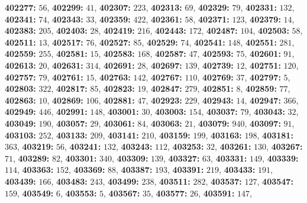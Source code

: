 \textsf{\bfseries 402277:} $56$, \textsf{\bfseries 402299:} $41$, \textsf{\bfseries 402307:} $223$, \textsf{\bfseries 402313:} $69$, \textsf{\bfseries 402329:} $79$, \textsf{\bfseries 402331:} $132$, \textsf{\bfseries 402341:} $74$, \textsf{\bfseries 402343:} $33$, \textsf{\bfseries 402359:} $422$, \textsf{\bfseries 402361:} $58$, \textsf{\bfseries 402371:} $123$, \textsf{\bfseries 402379:} $14$, \textsf{\bfseries 402383:} $205$, \textsf{\bfseries 402403:} $28$, \textsf{\bfseries 402419:} $216$, \textsf{\bfseries 402443:} $172$, \textsf{\bfseries 402487:} $104$, \textsf{\bfseries 402503:} $58$, \textsf{\bfseries 402511:} $13$, \textsf{\bfseries 402517:} $76$, \textsf{\bfseries 402527:} $85$, \textsf{\bfseries 402529:} $74$, \textsf{\bfseries 402541:} $148$, \textsf{\bfseries 402551:} $281$, \textsf{\bfseries 402559:} $255$, \textsf{\bfseries 402581:} $15$, \textsf{\bfseries 402583:} $168$, \textsf{\bfseries 402587:} $47$, \textsf{\bfseries 402593:} $75$, \textsf{\bfseries 402601:} $91$, \textsf{\bfseries 402613:} $20$, \textsf{\bfseries 402631:} $314$, \textsf{\bfseries 402691:} $28$, \textsf{\bfseries 402697:} $139$, \textsf{\bfseries 402739:} $12$, \textsf{\bfseries 402751:} $120$, \textsf{\bfseries 402757:} $79$, \textsf{\bfseries 402761:} $15$, \textsf{\bfseries 402763:} $142$, \textsf{\bfseries 402767:} $110$, \textsf{\bfseries 402769:} $37$, \textsf{\bfseries 402797:} $5$, \textsf{\bfseries 402803:} $322$, \textsf{\bfseries 402817:} $85$, \textsf{\bfseries 402823:} $19$, \textsf{\bfseries 402847:} $279$, \textsf{\bfseries 402851:} $8$, \textsf{\bfseries 402859:} $77$, \textsf{\bfseries 402863:} $10$, \textsf{\bfseries 402869:} $106$, \textsf{\bfseries 402881:} $47$, \textsf{\bfseries 402923:} $229$, \textsf{\bfseries 402943:} $14$, \textsf{\bfseries 402947:} $366$, \textsf{\bfseries 402949:} $446$, \textsf{\bfseries 402991:} $148$, \textsf{\bfseries 403001:} $30$, \textsf{\bfseries 403003:} $154$, \textsf{\bfseries 403037:} $79$, \textsf{\bfseries 403043:} $32$, \textsf{\bfseries 403049:} $190$, \textsf{\bfseries 403057:} $29$, \textsf{\bfseries 403061:} $84$, \textsf{\bfseries 403063:} $21$, \textsf{\bfseries 403079:} $940$, \textsf{\bfseries 403097:} $91$, \textsf{\bfseries 403103:} $252$, \textsf{\bfseries 403133:} $209$, \textsf{\bfseries 403141:} $210$, \textsf{\bfseries 403159:} $199$, \textsf{\bfseries 403163:} $198$, \textsf{\bfseries 403181:} $363$, \textsf{\bfseries 403219:} $56$, \textsf{\bfseries 403241:} $132$, \textsf{\bfseries 403243:} $112$, \textsf{\bfseries 403253:} $32$, \textsf{\bfseries 403261:} $130$, \textsf{\bfseries 403267:} $71$, \textsf{\bfseries 403289:} $82$, \textsf{\bfseries 403301:} $340$, \textsf{\bfseries 403309:} $139$, \textsf{\bfseries 403327:} $63$, \textsf{\bfseries 403331:} $149$, \textsf{\bfseries 403339:} $114$, \textsf{\bfseries 403363:} $152$, \textsf{\bfseries 403369:} $88$, \textsf{\bfseries 403387:} $193$, \textsf{\bfseries 403391:} $219$, \textsf{\bfseries 403433:} $191$, \textsf{\bfseries 403439:} $166$, \textsf{\bfseries 403483:} $243$, \textsf{\bfseries 403499:} $238$, \textsf{\bfseries 403511:} $282$, \textsf{\bfseries 403537:} $127$, \textsf{\bfseries 403547:} $159$, \textsf{\bfseries 403549:} $6$, \textsf{\bfseries 403553:} $5$, \textsf{\bfseries 403567:} $35$, \textsf{\bfseries 403577:} $26$, \textsf{\bfseries 403591:} $147$, 
